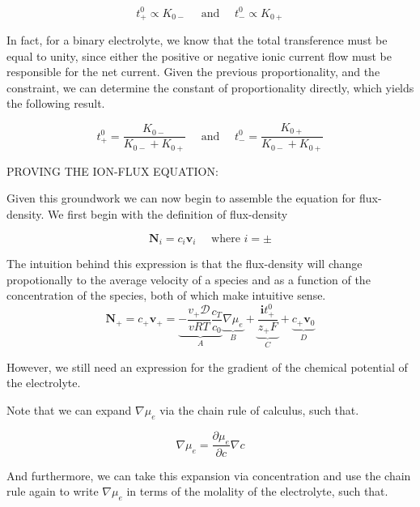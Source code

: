 \documentclass[lettersize,journal]{IEEEtran}
\begin{document}
\begin{equation}
t_{+}^{0} \propto K_{0-} \quad \text { and } \quad t_{-}^{0} \propto K_{0+}
\end{equation}

In fact, for a binary electrolyte, we know that the total transference must be equal to unity, since either the positive or negative ionic current flow must be responsible for the net current. Given the previous proportionality, and the constraint, we can determine the constant of proportionality directly, which yields the following result.

\begin{equation}
t_{+}^{0}=\frac{K_{0-}}{K_{0-}+K_{0+}} \quad \text { and } \quad t_{-}^{0}=\frac{K_{0+}}{K_{0-}+K_{0+}}
\end{equation}


PROVING THE ION-FLUX EQUATION:

Given this groundwork we can now begin to assemble the equation for flux-density. We first begin with the definition of flux-density


\begin{equation}
  \textbf{N}_i = c_{i} \textbf{v}_i \quad \text{    where } i = \pm
\end{equation}

The intuition behind this expression is that the flux-density will change propotionally to the average velocity of a species and as a function of the concentration of the species, both of which make intuitive sense. \\

\begin{equation}
\mathbf{N}_{+}=c_{+} \mathbf{v}_{+}=\underbrace{-\frac{v_{+} \mathscr{D}}{v R T} \frac{c_{T}}{c_{0}}}_{A} \underbrace{\nabla \mu_{e}}_{B}+\underbrace{\frac{\mathbf{i} t_{+}^{0}}{z_{+} F}}_{C}+\underbrace{c_{+} \mathbf{v}_{0}}_{D}
\end{equation}


However, we still need an expression for the gradient of the chemical potential of the electrolyte.

Note that we can expand $\nabla \mu_e$ via the chain rule of calculus, such that.


\begin{equation}
  \nabla \mu_e = \frac{\partial{\mu_e}}{\partial{c}} \nabla c
\end{equation}

And furthermore, we can take this expansion via concentration and use the chain rule again to write $\nabla \mu_e$ in terms of the molality of the electrolyte, such that.
\end{document}
